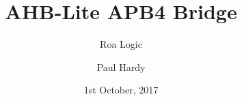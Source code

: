 \usepackage{pkg/roalogictitle}


\title{AHB-Lite APB4 Bridge}
\author{Roa Logic}
\date{1st October, 2017}
\author{Paul Hardy}

\pagestyle{fancy}
\fancyhf{}
\fancyhead[R]{\thepage}

